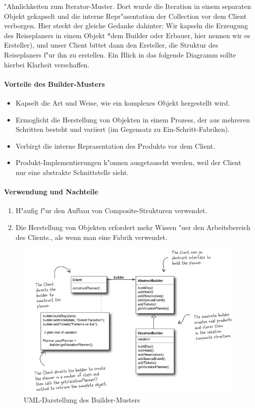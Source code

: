"Ahnlichkeiten zum Iterator-Muster. Dort wurde die Iteration in einem separaten Objekt gekapselt und die interne Repr"asentation der Collection vor dem Client verborgen. Hier steckt der gleiche Gedanke dahinter: Wir kapseln die Erzeugung des Reiseplaners in einem Objekt *dem Builder oder Erbauer, hier nennen wir es Ersteller), und unser Client bittet dann den Ersteller, die Struktur des Reiseplaners f"ur ihn zu erstellen. Ein Blick in das folgende Diagramm sollte hierbei Klarheit verschaffen. 

\paragraph{Vorteile des Builder-Musters}
\begin{itemize}
	\item Kapselt die Art und Weise, wie ein komplexes Objekt hergestellt wird.
	\item Ermoglicht die Herstellung von Objekten in einem Prozess, der aus mehreren Schritten besteht und variiert (im Gegensatz zu Ein-Schritt-Fabriken).
	\item Verbirgt die interne Reprasentation des Produkts vor dem Client. 
	\item Produkt-Implementierungen k"onnen ausgetauscht werden, weil der Client nur eine abstrakte Schnittstelle sieht. 
\end{itemize}

\paragraph{Verwendung und Nachteile}
\begin{enumerate}
	\item H"aufig f"ur den Aufbau von Composite-Strukturen verwendet. 
	\item Die Herstellung von Objekten erfordert mehr Wissen "uer den Arbeitsbereich des Clients., als wenn man eine Fabrik verwendet.
\end{enumerate}

\begin{figure} [!htb]
	\centering
	\includegraphics[width=.9\linewidth]{builder/img/builderUML}
	\caption{UML-Darstellung des Builder-Musters}
	\label{fig:builder}
\end{figure}